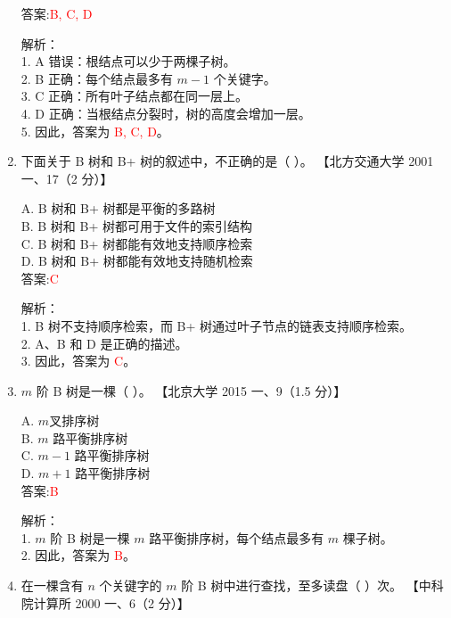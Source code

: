 \documentclass[lang=cn,newtx,10pt,scheme=chinese]{../../../elegantbook}
\begin{document}
\begin{enumerate}
    答案:\textcolor{red}{B, C, D}

    解析：\\
    1. A 错误：根结点可以少于两棵子树。\\
    2. B 正确：每个结点最多有 $m-1$ 个关键字。\\
    3. C 正确：所有叶子结点都在同一层上。\\
    4. D 正确：当根结点分裂时，树的高度会增加一层。\\
    5. 因此，答案为 \textcolor{red}{B, C, D}。\\

\item 下面关于 B 树和 B+ 树的叙述中，不正确的是（ ）。  
    【北方交通大学 2001 一、17（2 分）】  

    A. B 树和 B+ 树都是平衡的多路树 \\  
    B. B 树和 B+ 树都可用于文件的索引结构 \\  
    C. B 树和 B+ 树都能有效地支持顺序检索 \\  
    D. B 树和 B+ 树都能有效地支持随机检索 \\  

    答案:\textcolor{red}{C}

    解析：\\
    1. B 树不支持顺序检索，而 B+ 树通过叶子节点的链表支持顺序检索。\\
    2. A、B 和 D 是正确的描述。\\
    3. 因此，答案为 \textcolor{red}{C}。\\

\item $m$ 阶 B 树是一棵（ ）。  
    【北京大学 2015 一、9（1.5 分）】  

    A. $m$叉排序树 \\  
    B. $m$ 路平衡排序树 \\  
    C. $m-1$ 路平衡排序树 \\  
    D. $m+1$ 路平衡排序树 \\  

    答案:\textcolor{red}{B}

    解析：\\
    1. $m$ 阶 B 树是一棵 $m$ 路平衡排序树，每个结点最多有 $m$ 棵子树。\\
    2. 因此，答案为 \textcolor{red}{B}。\\

\item 在一棵含有 $n$ 个关键字的 $m$ 阶 B 树中进行查找，至多读盘（ ）次。  
    【中科院计算所 2000 一、6（2 分）】  


\end{enumerate}
\end{document}
